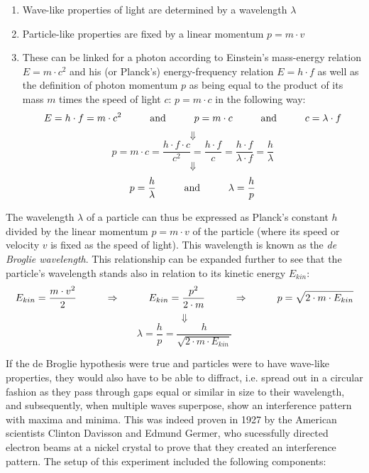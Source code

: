 \begin{enumerate}
	
	\item Wave-like properties of light are determined by a wavelength $\lambda$

	\item Particle-like properties are fixed by a linear momentum $p = m \cdot v$

	\item These can be linked for a photon according to Einstein's mass-energy relation $E = m \cdot c^2$ and his (or Planck's) energy-frequency relation $E = h \cdot f$ as well as the definition of photon momentum $p$ as being equal to the product of its mass $m$ times the speed of light $c$: $p = m \cdot c$ in the following way: $$E = h \cdot f = m \cdot c^2 \hspace{1 cm} \text{and} \hspace{1 cm} p = m \cdot c \hspace{1 cm} \text{and} \hspace{1 cm} c = \lambda \cdot f$$ $$\Downarrow$$ $$p = m \cdot c = \frac{h \cdot f \cdot c}{c^2} = \frac{h \cdot f}{c} = \frac{h \cdot f}{\lambda \cdot f} = \frac{h}{\lambda}$$ $$\Downarrow$$ $$p = \frac{h}{\lambda} \hspace{1 cm} \text{and} \hspace{1 cm} \lambda = \frac{h}{p}$$

\end{enumerate}

The wavelength $\lambda$ of a particle can thus be expressed as Planck's constant $h$ divided by the linear momentum $p = m \cdot v$ of the particle (where its speed or velocity $v$ is fixed as the speed of light). This wavelength is known as the \emph{de Broglie wavelength}. This relationship can be expanded further to see that the particle's wavelength stands also in relation to its kinetic energy $E_{kin}$: $$E_{kin} = \frac{m \cdot v^2}{2} \hspace{1 cm} \Rightarrow \hspace{1 cm} E_{kin} =  \frac{p^2}{2 \cdot m} \hspace{1 cm} \Rightarrow \hspace{1 cm} p = \sqrt{2 \cdot m \cdot E_{kin}}$$ $$\Downarrow$$ $$\lambda = \frac{h}{p} = \frac{h}{\sqrt{2 \cdot m \cdot E_{kin}}}$$

\pagebreak


If the de Broglie hypothesis were true and particles were to have wave-like properties, they would also have to be able to diffract, i.e. spread out in a circular fashion as they pass through gaps equal or similar in size to their wavelength, and subsequently, when multiple waves superpose, show an interference pattern with maxima and minima. This was indeed proven in 1927 by the American scientists Clinton Davisson and Edmund Germer, who sucessfully directed electron beams at a nickel crystal to prove that they created an interference pattern. The setup of this experiment included the following components:

